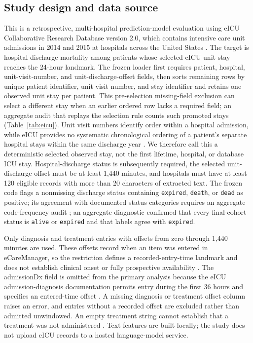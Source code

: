 \documentclass[11pt]{article}
\begin{document}
\subsection*{Study design and data source}\label{study-design-and-data-source}

This is a retrospective, multi-hospital prediction-model evaluation using eICU Collaborative Research Database version 2.0, which contains intensive care unit admissions in 2014 and 2015 at hospitals across the United States \cite{r1,r2}. The target is hospital-discharge mortality among patients whose selected eICU unit stay reaches the 24-hour landmark. The frozen loader first requires patient, hospital, unit-visit-number, and unit-discharge-offset fields, then sorts remaining rows by unique patient identifier, unit visit number, and stay identifier and retains one observed unit stay per patient. This pre-selection missing-field exclusion can select a different stay when an earlier ordered row lacks a required field; an aggregate audit that replays the selection rule counts such promoted stays (Table~\ref{tab:eicu}). Unit visit numbers identify order within a hospital admission, while eICU provides no systematic chronological ordering of a patient's separate hospital stays within the same discharge year \cite{r11}. We therefore call this a deterministic selected observed stay, not the first lifetime, hospital, or database ICU stay. Hospital-discharge status is subsequently required, the selected unit-discharge offset must be at least 1,440 minutes, and hospitals must have at least 120 eligible records with more than 20 characters of extracted text. The frozen code flags a nonmissing discharge status containing \texttt{expired}, \texttt{death}, or \texttt{dead} as positive; its agreement with documented status categories requires an aggregate code-frequency audit \cite{r11}; an aggregate diagnostic confirmed that every final-cohort status is \texttt{alive} or \texttt{expired} and that labels agree with \texttt{expired}.

Only diagnosis and treatment entries with offsets from zero through 1,440 minutes are used. These offsets record when an item was entered in eCareManager, so the restriction defines a recorded-entry-time landmark and does not establish clinical onset or fully prospective availability \cite{r13,r14}. The admissionDx field is omitted from the primary analysis because the eICU admission-diagnosis documentation permits entry during the first 36 hours and specifies an entered-time offset \cite{r12}. A missing diagnosis or treatment offset column raises an error, and entries without a recorded offset are excluded rather than admitted unwindowed. An empty treatment string cannot establish that a treatment was not administered \cite{r14}. Text features are built locally; the study does not upload eICU records to a hosted language-model service.
\end{document}
